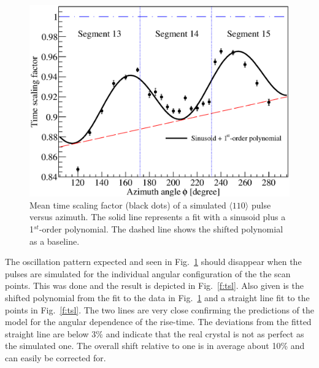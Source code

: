 \documentclass[epj,referee]{svjour}
\begin{document}
\begin{figure}[htpb]
\centering
\includegraphics[width=\linewidth]{tsc}
\caption{Mean time scaling factor (black dots) of a simulated $\langle
110 \rangle$ pulse versus azimuth. The solid line represents a fit
with a sinusoid plus a 1$^{st}$-order polynomial. The dashed line
shows the shifted polynomial as a baseline.}
\label{f:tsc}
\end{figure}

The oscillation pattern expected and seen in Fig.~\ref{f:tsc} should
disappear when the pulses are simulated for the individual angular
configuration of the the scan points. This was done and the result is
depicted in Fig.~\ref{f:tsl}. Also given is the shifted polynomial
from the fit to the data in Fig.~\ref{f:tsc} and a straight line fit
to the points in Fig.~\ref{f:tsl}. The two lines are very close
confirming the predictions of the model for the angular dependence of
the rise-time. The deviations from the fitted straight line are below
3\% and indicate that the real crystal is not as perfect as the
simulated one. The overall shift relative to one is in average about
10\% and can easily be corrected for.
\end{document}
